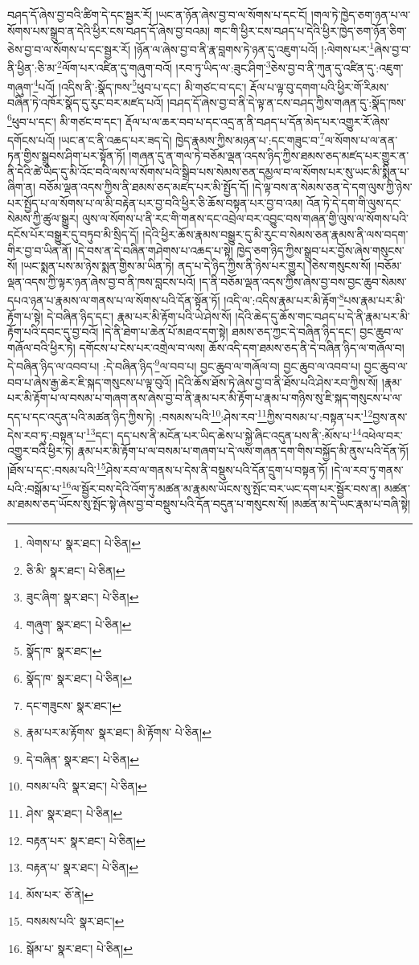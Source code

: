 བཤད་དོ་ཞེས་བྱ་བའི་ཚིག་དེ་དང་སྦྱར་རོ། །ཡང་ན་ཉོན་ཞེས་བྱ་བ་ལ་སོགས་པ་དང་ངོ། །གལ་ཏེ་ཁྱེད་ཅག་ཉན་པ་ལ་སོགས་པས་སྒྲུབ་ན་དེའི་ཕྱིར་ངས་བཤད་དོ་ཞེས་བྱ་བའམ། གང་གི་ཕྱིར་ངས་བཤད་པ་དེའི་ཕྱིར་ཁྱེད་ཅག་ཉོན་ཅིག་ཅེས་བྱ་བ་ལ་སོགས་པ་དང་སྦྱར་རོ། །ཉོན་ལ་ཞེས་བྱ་བ་ནི་རྣ་བླགས་ཏེ་ཉན་དུ་འཇུག་པའོ། །:ལེགས་པར་\footnote{ལེགས་པ་  སྣར་ཐང་།  པེ་ཅིན། }ཞེས་བྱ་བ་ནི་ཕྱིན་:ཅི་མ་\footnote{ཅི་མི་  སྣར་ཐང་།  པེ་ཅིན། }ལོག་པར་འཛིན་དུ་གཞུག་བའོ། །རབ་ཏུ་ཡིད་ལ་:ཟུང་ཤིག་\footnote{ཟུང་ཞིག་  སྣར་ཐང་།  པེ་ཅིན། }ཅེས་བྱ་བ་ནི་ཀུན་དུ་འཛིན་དུ་:འཇུག་གཞུག་\footnote{གཞུག་  སྣར་ཐང་།  པེ་ཅིན། }པའོ། །འདིས་ནི་:སྣོད་ཁས་\footnote{སྣོད་ཁ་  སྣར་ཐང་། }ཕུབ་པ་དང་། མི་གཙང་བ་དང་། རྡོལ་པ་ལྟ་བུ་དགག་པའི་ཕྱིར་གོ་རིམས་བཞིན་ཏེ་འཁོར་སྣོད་དུ་རུང་བར་མཛད་པའོ། །བཤད་དོ་ཞེས་བྱ་བ་ནི་དེ་ལྟ་ན་ངས་བཤད་ཀྱིས་གཞན་དུ་:སྣོད་ཁས་\footnote{སྣོད་ཁ་  སྣར་ཐང་།  པེ་ཅིན། }ཕུབ་པ་དང་། མི་གཙང་བ་དང་། རྡོལ་པ་ལ་ཆར་བབ་པ་དང་འདྲ་ན་ནི་བཤད་པ་དོན་མེད་པར་འགྱུར་རོ་ཞེས་དགོངས་པའོ། །ཡང་ན་ང་ནི་འཆད་པར་ཟད་དེ། ཁྱེད་རྣམས་ཀྱིས་མཉན་པ་:དང་གཟུང་བ་\footnote{དང་གཟུངས་  སྣར་ཐང་། }ལ་སོགས་པ་ལ་ནན་ཏན་གྱིས་སྒྲུབས་ཤིག་པར་སྟོན་ཏོ། །གཞན་དུ་ན་གལ་ཏེ་བཅོམ་ལྡན་འདས་ཉིད་ཀྱིས་ཐམས་ཅད་མཛད་པར་གྱུར་ན་ནི་དེའི་ཚེ་ཡིད་དུ་མི་འོང་བའི་ལས་ལ་སོགས་པའི་སྒྲིབ་པས་སེམས་ཅན་དམྱལ་བ་ལ་སོགས་པར་སུ་ཡང་མི་སྨིན་པ་ཞིག་ན། བཅོམ་ལྡན་འདས་ཀྱིས་ནི་ཐམས་ཅད་མཛད་པར་མི་སྤྱོད་དོ། །དེ་ལྟ་བས་ན་སེམས་ཅན་དེ་དག་ལུས་ཀྱི་ཉེས་པར་སྤྱོད་པ་ལ་སོགས་པ་ལ་མི་བརྟེན་པར་བྱ་བའི་ཕྱིར་ཅི་ཆོས་བསྟན་པར་བྱ་བ་འམ། འོན་ཏེ་དེ་དག་གི་ལུས་དང་སེམས་ཀྱི་ཚུལ་སྒྱུར། ལུས་ལ་སོགས་པ་ནི་རང་གི་གནས་དང་འབྲེལ་བར་འབྱུང་བས་གཞན་གྱི་ལུས་ལ་སོགས་པའི་དངོས་པོར་བསྒྱུར་དུ་བཏུབ་མི་སྲིད་དོ། །དེའི་ཕྱིར་ཆོས་རྣམས་བསྒྱུར་དུ་མི་རུང་བ་སེམས་ཅན་རྣམས་ནི་ལས་བདག་གིར་བྱ་བ་ཡིན་ནོ། །དེ་བས་ན་དེ་བཞིན་གཤེགས་པ་འཆད་པ་སྟེ། ཁྱེད་ཅག་ཉིད་ཀྱིས་སྒྲུབ་པར་བྱོས་ཞེས་གསུངས་སོ། །ཡང་སྨན་པས་མ་ཉེས་སྨན་གྱིས་མ་ཡིན་ཏེ། ནད་པ་དེ་ཉིད་ཀྱིས་ནི་ཉེས་པར་གྱུར། །ཅེས་གསུངས་སོ། །བཅོམ་ལྡན་འདས་ཀྱི་ལྟར་ཉན་ཞེས་བྱ་བ་ནི་ཁས་བླངས་པའོ། །ད་ནི་བཅོམ་ལྡན་འདས་ཀྱིས་ཞེས་བྱ་བས་བྱང་ཆུབ་སེམས་དཔའ་ཉན་པ་རྣམས་ལ་གནས་པ་ལ་སོགས་པའི་དོན་སྟོན་ཏོ། །འདི་ལ་:འདིས་རྣམ་པར་མི་རྟོག་\footnote{རྣམ་པར་མ་རྟོགས་  སྣར་ཐང་། མི་རྟོགས་  པེ་ཅིན། }པས་རྣམ་པར་མི་རྟོག་པ་སྟེ། དེ་བཞིན་ཉིད་དང་། རྣམ་པར་མི་རྟོག་པའི་ཡེ་ཤེས་སོ། །དེའི་ཆེད་དུ་ཆོས་གང་བཤད་པ་དེ་ནི་རྣམ་པར་མི་རྟོག་པའི་དབང་དུ་བྱ་བའོ། །དེ་ནི་ཐེག་པ་ཆེན་པོ་མཐའ་དག་སྟེ། ཐམས་ཅད་ཀྱང་དེ་བཞིན་ཉིད་དང་། བྱང་ཆུབ་ལ་གཞོལ་བའི་ཕྱིར་ཏེ། དགོངས་པ་ངེས་པར་འགྲེལ་བ་ལས། ཆོས་འདི་དག་ཐམས་ཅད་ནི་དེ་བཞིན་ཉིད་ལ་གཞོལ་བ། དེ་བཞིན་ཉིད་ལ་འབབ་པ། :དེ་བཞིན་ཉིད་\footnote{དེ་བཞིན་  སྣར་ཐང་།  པེ་ཅིན། }ལ་བབ་པ། བྱང་ཆུབ་ལ་གཞོལ་བ། བྱང་ཆུབ་ལ་འབབ་པ། བྱང་ཆུབ་ལ་བབ་པ་ཞེས་རྒྱ་ཆེར་ཇི་སྐད་གསུངས་པ་ལྟ་བུའོ། །དེའི་ཆོས་ཐོས་ཏེ་ཞེས་བྱ་བ་ནི་ཐོས་པའི་ཤེས་རབ་ཀྱིས་སོ། །རྣམ་པར་མི་རྟོག་པ་ལ་བསམ་པ་གཞག་ནས་ཞེས་བྱ་བ་ནི་རྣམ་པར་མི་རྟོག་པ་རྣམ་པ་གཉིས་སུ་ཇི་སྐད་གསུངས་པ་ལ་དད་པ་དང་འདུན་པའི་མཚན་ཉིད་ཀྱིས་ཏེ། :བསམས་པའི་\footnote{བསམ་པའི་  སྣར་ཐང་།  པེ་ཅིན། }:ཤེས་རབ་\footnote{ཤེས་  སྣར་ཐང་།  པེ་ཅིན། }ཀྱིས་བསམ་པ་:བསྟན་པར་\footnote{བརྟན་པར་  སྣར་ཐང་།  པེ་ཅིན། }བྱས་ནས་དེས་རབ་ཏུ་:བསྟན་པ་\footnote{བརྟན་པ་  སྣར་ཐང་།  པེ་ཅིན། }དང་། དད་པས་ནི་མངོན་པར་ཡིད་ཆེས་པ་སྐྱེ་ཞིང་འདུན་པས་ནི་:མོས་པ་\footnote{མོས་པར་  ཅོ་ནེ། }འཕེལ་བར་འགྱུར་བའི་ཕྱིར་ཏེ། རྣམ་པར་མི་རྟོག་པ་ལ་བསམ་པ་གཞག་པ་དེ་ལས་གཞན་དག་གིས་བསྐྱོད་མི་ནུས་པའི་དོན་ཏོ། །ཐོས་པ་དང་:བསམ་པའི་\footnote{བསམས་པའི་  སྣར་ཐང་། }ཤེས་རབ་ལ་གནས་པ་དེས་ནི་བསྡུས་པའི་དོན་དྲུག་པ་བསྟན་ཏོ། །དེ་ལ་རབ་ཏུ་གནས་པའི་:བསྒོམ་པ་\footnote{སྒོམ་པ་  སྣར་ཐང་།  པེ་ཅིན། }ལ་སྦྱོར་བས་དེའི་འོག་ཏུ་མཚན་མ་རྣམས་ཡོངས་སུ་སྤོང་བར་ཡང་དག་པར་སྦྱོར་བས་ན། མཚན་མ་ཐམས་ཅད་ཡོངས་སུ་སྤོང་སྟེ་ཞེས་བྱ་བ་བསྡུས་པའི་དོན་བདུན་པ་གསུངས་སོ། །མཚན་མ་དེ་ཡང་རྣམ་པ་བཞི་སྟེ། 